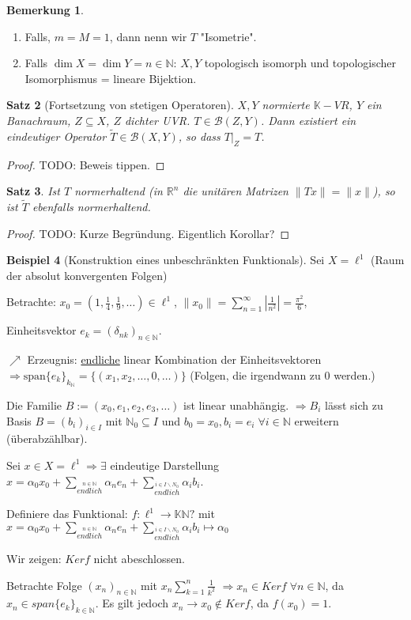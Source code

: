 \documentclass[ngerman]{report}
\theoremstyle{plain}%
\newtheorem{thm}{Satz}[chapter]
\theoremstyle{definition}%
\newtheorem{bsp}[thm]{Beispiel}
\theoremstyle{myStyle}
\newtheorem{bem}[thm]{Bemerkung}
\newcommand{\R}{\mathbb{R}}
\newcommand{\N}{\mathbb{N}}
\newcommand{\K}{\mathbb{K}}
\newcommand{\B}{\mathcal{B}} %
\newcommand{\BS}[1][X,Y]{\mathcal{B}(#1)} %
\newcommand{\norm}[1]{\|#1\|}
\newcommand{\df}[1][]{%
	\overset{#1}{\Rightarrow}
}
\newcommand{\qmarks}[1]{"#1"}
\begin{document}
	\begin{bem}
		\begin{enumerate}
			\item Falls, $m=M=1$, dann nenn wir $T$ \qmarks{Isometrie}.
			\item Falls $\dim X = \dim Y = n\in \N$: $X,Y$ topologisch isomorph und topologischer Isomorphismus = lineare Bijektion.
		\end{enumerate}
	\end{bem}
	\begin{thm}[Fortsetzung von stetigen Operatoren]
		$X,Y$ normierte $\K-VR$, $Y$ ein Banachraum, $Z\subseteq X$, $Z$ dichter UVR.
		$T\in \B(Z,Y)$. Dann existiert ein eindeutiger Operator $\tilde{T} \in \BS$, so dass
		$T|_Z = T$.
	\end{thm}
	\begin{proof}
					TODO: Beweis tippen.
	\end{proof}
	\begin{thm}
					Ist $T$ normerhaltend (in $\R^n$ die unitären Matrizen $\norm{Tx} = \norm{x}$), so ist $\tilde{T}$ ebenfalls normerhaltend.
	\end{thm}
		\begin{proof}
						TODO: Kurze Begründung. Eigentlich Korollar?%
		\end{proof}

	\begin{bsp}[Konstruktion eines unbeschränkten Funktionals]
		Sei $X= \ell^1$ ({Raum der absolut konvergenten Folgen})\par
		Betrachte: $x_0 = (1, \frac{1}{4}, \frac{1}{9},\dots) \in \ell^1$, 
		$\norm{x_0} = \sum_{n=1}^\infty |\frac{1}{n^2}| = \frac{\pi^2}{6} $,\par
		Einheitsvektor $e_k = (\delta_{nk})_{n\in\N}$.\par 
		$\nearrow$ Erzeugnis: \underline{endliche} linear Kombination der Einheitsvektoren 
		$\df \text{span} \{e_k\}_{k_\N} = \{(x_1,x_2,\dots,0,\dots)\}$ (Folgen, die irgendwann zu $0$ werden.)\par
		Die Familie $B := (x_0,e_1,e_2,e_3,\dots)$ ist linear unabhängig.
		$\df B_i$ lässt sich zu Basis $B = (b_i)_{i\in I}$ mit $\N_0 \subseteq I$ und $b_0 = x_0, b_i = e_i \; \forall i\in \N$ erweitern (überabzählbar).\par
		Sei $x\in X= \ell^1 \df \exists$ eindeutige Darstellung 
		$x = \alpha_0 x_0 +\sum_{\overset{n\in\N}{endlich}} \alpha_n e_n + \sum_{\overset{i\in I\backslash N_0}{endlich}}\alpha_i b_i$. \par
		Definiere das Funktional: $f: \ell^1 \to \K \N?$ mit $x = \alpha_0 x_0 +\sum_{\overset{n\in\N}{endlich}} \alpha_n e_n + \sum_{\overset{i\in I\backslash N_0}{endlich}}\alpha_i b_i \mapsto \alpha_0$\par
	Wir zeigen: $Ker f$ nicht abeschlossen.\par
		Betrachte Folge $(x_n)_{n\in\N}$ mit $x_n \sum_{k=1}^n \frac{1}{k^2}$		 
		$\df x_n\in Ker f \; \forall n\in\N$, da $x_n\in span\{e_k\}_{k\in\N}$. 
		Es gilt jedoch $x_n \to x_0 \not\in Ker f$, da $f(x_0) = 1$.
	\end{bsp}
\end{document}
